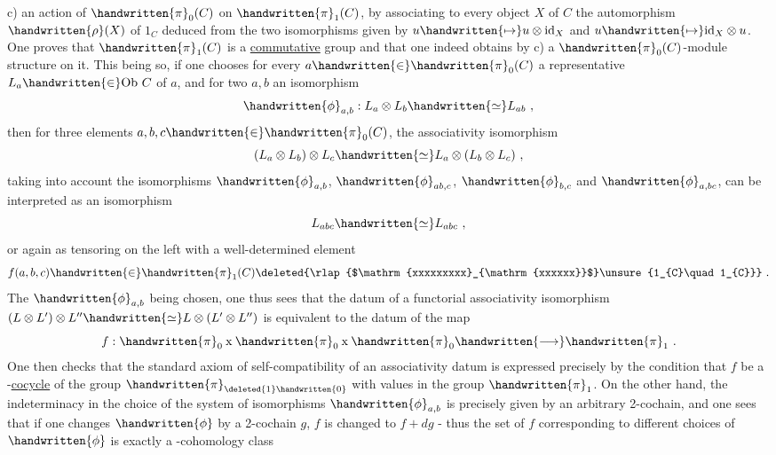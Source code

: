 c) an action of $\handwritten{\pi}_{0}(C)$ on $\handwritten{\pi}_{1}(C)$, by associating to every object $X$ of $C$ the automorphism  $\handwritten{\rho}(X)$ of $1_C$ deduced from the two isomorphisms
given by $u\handwritten{\mapsto}u\otimes\mathrm{id}_{X}$ and $u\handwritten{\mapsto}\mathrm{id}_{X}\otimes u$. One proves that $\handwritten{\pi}_{1}(C)$ is a \uline{commutative} group and that one indeed obtains by c) a $\handwritten{\pi}_{0}(C)$-module structure on it. This being so, if one chooses for every $a\handwritten{\in}\handwritten{\pi}_{0}(C)$ a representative $L_{a}\handwritten{\in}\mathrm{Ob}\ C$ of $a$, and for two  $a,b$ an isomorphism
\[
\handwritten{\phi}_{a,b}: L_a\otimes L_b\handwritten{\simeq}L_{ab}\ ,
\]
then for three elements $a,b,c\handwritten{\in}\handwritten{\pi}_{0}(C)$, the associativity isomorphism
\[
(L_a\otimes L_b)\otimes L_c\handwritten{\simeq}L_a\otimes(L_b\otimes L_c)\ ,
\]
taking into account the isomorphisms $\handwritten{\phi}_{a,b}$, $\handwritten{\phi}_{ab,c}$, $\handwritten{\phi}_{b,c}$ and $\handwritten{\phi}_{a,bc}$, can be interpreted as an isomorphism
\[
L_{abc}\handwritten{\simeq}L_{abc}\ ,
\]
or again as tensoring on the left with a well-determined element
\[
f(a,b,c)\handwritten{\in}\handwritten{\pi}_{1}(C)\deleted{\rlap{$\mathrm{xxxxxxxxx}_{\mathrm{xxxxxx}}$}\unsure{1_{C}\quad 1_{C}}}\ .
\]
The $\handwritten{\phi}_{a,b}$ being chosen, one thus sees that the datum of a functorial associativity isomorphism $(L\otimes L')\otimes L''\handwritten{\simeq}L\otimes(L'\otimes L'')$ is equivalent to the datum of the map
\[
f:\handwritten{\pi}_{0}\mathbin{\mathrm{x}}\handwritten{\pi}_{0}\mathbin{\mathrm{x}}\handwritten{\pi}_{0}\handwritten{\longrightarrow}\handwritten{\pi}_{1}\ .
\]
One then checks that the standard axiom  of self-compatibility of an associativity datum  is expressed precisely by the condition that $f$ be a -\uline{cocycle} of the group $\handwritten{\pi}_{\deleted{1}\handwritten{0}}$ with values in the group $\handwritten{\pi}_{1}$. On the other hand, the indeterminacy in the choice of the system of isomorphisms $\handwritten{\phi}_{a,b}$ is precisely given by an arbitrary 2-cochain, and one sees that if one changes $\handwritten{\phi}$ by a 2-cochain $g$, $f$ is changed to $f+dg$ - thus the set of $f$ corresponding to different choices of $\handwritten{\phi}$ is exactly a -cohomology class

